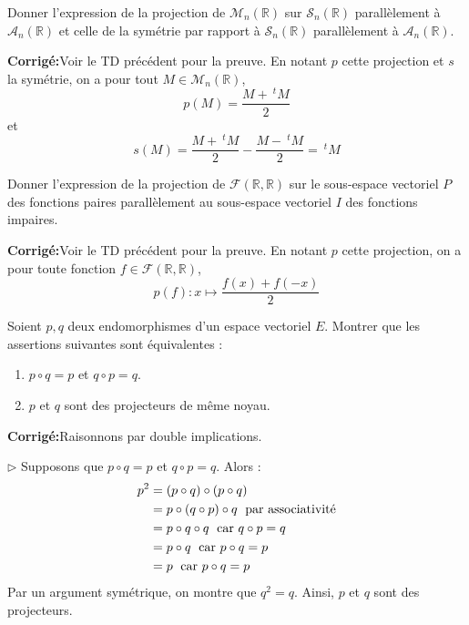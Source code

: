 \documentclass[a4paper,twoside,french,11pt]{VcCours}
\newcommand{\corr}{\textbf{Corrigé:}}
\begin{document}
\begin{Exercice}{} Donner l'expression de la projection de $\mathcal{M}_n(\mathbb{R})$ sur $\mathcal{S}_n(\mathbb{R})$ parallèlement à $\mathcal{A}_n(\mathbb{R})$ et celle de la symétrie par rapport à $\mathcal{S}_n(\mathbb{R})$ parallèlement à $\mathcal{A}_n(\mathbb{R})$.
\end{Exercice}

\corr Voir le TD précédent pour la preuve. En notant $p$ cette projection et $s$ la symétrie, on a pour tout $M \in \mathcal{M}_n(\mathbb{R})$, 
$$ p(M) = \dfrac{M+ ~^t M}{2}$$
et 
$$ s(M) =  \dfrac{M+ ~^t M}{2} -  \dfrac{M- ~^t M}{2} =~^t M$$





\begin{Exercice}{} Donner l'expression de la projection de $\mathcal{F}(\mathbb{R}, \mathbb{R})$ sur le sous-espace vectoriel $P$ des fonctions paires parallèlement au sous-espace vectoriel $I$ des fonctions impaires.
\end{Exercice}

\corr Voir le TD précédent pour la preuve. En notant $p$ cette projection, on a pour toute fonction $f \in \mathcal{F}(\mathbb{R}, \mathbb{R})$,
$$ p(f) : x  \mapsto \dfrac{f(x)+f(-x)}{2}$$




\begin{Exercice}{} Soient $p,q$ deux endomorphismes d'un espace vectoriel $E$. Montrer que les assertions suivantes sont équivalentes :
    \begin{enumerate}
\item $p \circ q = p$ et $q \circ p = q$.
\item $p$ et $q$ sont des projecteurs de même noyau.
    \end{enumerate}
\end{Exercice}

\corr Raisonnons par double implications.



\noindent $\rhd$ Supposons que $p \circ q = p$ et $q \circ p = q$.  Alors :
\begin{align*}
p^2 & = (p \circ q) \circ (p \circ q) \\
&=p \circ (q \circ p) \circ q \; \hbox{ par associativité} \\
& =p \circ q \circ q  \; \hbox{ car } q \circ p = q\\
&=  p \circ q \; \hbox{ car } p \circ q = p\\
& = p \; \hbox{ car }  p\circ q = p
\end{align*}
Par un argument symétrique, on montre que $q^2=q$. Ainsi, $p$ et $q$ sont des projecteurs.
\end{document}
